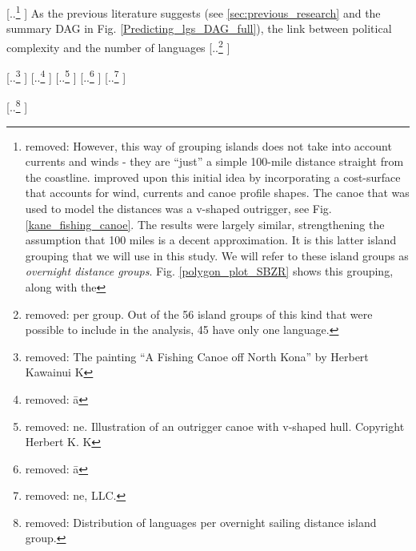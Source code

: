 \documentclass[unnumsec,webpdf,modern,medium]{oup-authoring-template}
\providecommand{\DIFaddtex}[1]{{\protect\color{blue} \sf #1}} %
\providecommand{\DIFdeltex}[1]{{\protect\color{red} [..\footnote{removed: #1} ]}} %
\providecommand{\DIFaddbegin}{} %
\providecommand{\DIFaddend}{} %
\providecommand{\DIFdelbegin}{} %
\providecommand{\DIFdelend}{} %
\providecommand{\DIFdelFL}[1]{\DIFdel{#1}} %
\providecommand{\DIFadd}[1]{\texorpdfstring{\DIFaddtex{#1}}{#1}} %
\providecommand{\DIFdel}[1]{\texorpdfstring{\DIFdeltex{#1}}{}} %
\newcommand{\DIFscaledelfig}{0.5}
\newlength{\DIFdelgraphicswidth} %
\newlength{\DIFdelgraphicsheight} %
\newcommand{\DIFaddincludegraphics}[2][]{{\color{blue}\fbox{\DIFOincludegraphics[#1]{#2}}}} %
\newcommand{\DIFdelincludegraphics}[2][]{%
\sbox{\DIFdelgraphicsbox}{\DIFOincludegraphics[#1]{#2}}%
\settoboxwidth{\DIFdelgraphicswidth}{\DIFdelgraphicsbox} %
\settoboxtotalheight{\DIFdelgraphicsheight}{\DIFdelgraphicsbox} %
\scalebox{\DIFscaledelfig}{%
\parbox[b]{\DIFdelgraphicswidth}{\usebox{\DIFdelgraphicsbox}\\[-\baselineskip] \rule{\DIFdelgraphicswidth}{0em}}\llap{\resizebox{\DIFdelgraphicswidth}{\DIFdelgraphicsheight}{%
\setlength{\unitlength}{\DIFdelgraphicswidth}%
\begin{picture}(1,1)%
\thicklines\linethickness{2pt} %
{\color[rgb]{1,0,0}\put(0,0){\framebox(1,1){}}}%
{\color[rgb]{1,0,0}\put(0,0){\line( 1,1){1}}}%
{\color[rgb]{1,0,0}\put(0,1){\line(1,-1){1}}}%
\end{picture}%
}\hspace*{3pt}}} %
} %
\DeclareRobustCommand{\DIFaddbegin}{\DIFOaddbegin \let\includegraphics\DIFaddincludegraphics} %
\DeclareRobustCommand{\DIFaddend}{\DIFOaddend \let\includegraphics\DIFOincludegraphics} %
\DeclareRobustCommand{\DIFdelbegin}{\DIFOdelbegin \let\includegraphics\DIFdelincludegraphics} %
\DeclareRobustCommand{\DIFdelend}{\DIFOaddend \let\includegraphics\DIFOincludegraphics} %
\begin{document}
\DIFdelbegin \DIFdel{However, this way of grouping islands does not take into account currents and winds - they are ``just'' a simple 100-mile distance straight from the coastline. \citet{NZSA_overnight_2023} improved upon this initial idea by incorporating a cost-surface that accounts for wind, currents and canoe profile shapes. The canoe that was used to model the distances was a v-shaped outrigger, see Fig. \ref{kane_fishing_canoe}. The results were largely similar, strengthening the assumption that 100 miles is a decent approximation. It is this latter island grouping that we will use in this study. We will refer to these island groups as \textit{overnight distance groups}. Fig. \ref{polygon_plot_SBZR} shows this grouping, along with the }\DIFdelend \DIFaddbegin \DIFadd{As the previous literature suggests (see \ref{sec:previous_research} and the summary DAG in Fig. \ref{Predicting_lgs_DAG_full}), the link between political complexity and the }\DIFaddend number of languages \DIFdelbegin \DIFdel{per group. Out of the 56 island groups of this kind that were possible to include in the analysis, 45 have only one language.
}%

{%
\DIFdelFL{The painting ``A Fishing Canoe off North Kona'' by Herbert Kawainui K}%
\DIFdelFL{\=a}%
\DIFdelFL{ne. Illustration of an outrigger canoe with v-shaped hull. Copyright Herbert K. K}%
\DIFdelFL{\=a}%
\DIFdelFL{ne, LLC.}%
}

{%
\DIFdel{Distribution of languages per overnight sailing distance island group.}%
}
\end{document}
